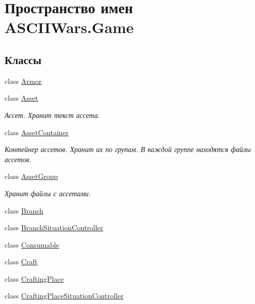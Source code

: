 \hypertarget{namespace_a_s_c_i_i_wars_1_1_game}{}\section{Пространство имен A\+S\+C\+I\+I\+Wars.\+Game}
\label{namespace_a_s_c_i_i_wars_1_1_game}
\subsection*{Классы}
\begin{DoxyCompactItemize}
\item 
class \hyperlink{class_a_s_c_i_i_wars_1_1_game_1_1_armor}{Armor}
\item 
class \hyperlink{class_a_s_c_i_i_wars_1_1_game_1_1_asset}{Asset}
\begin{DoxyCompactList}\small\item\em Ассет. Хранит текст ассета. \end{DoxyCompactList}\item 
class \hyperlink{class_a_s_c_i_i_wars_1_1_game_1_1_asset_container}{Asset\+Container}
\begin{DoxyCompactList}\small\item\em Контейнер ассетов. Хранит их по групам. В каждой группе находятся файлы ассетов. \end{DoxyCompactList}\item 
class \hyperlink{class_a_s_c_i_i_wars_1_1_game_1_1_asset_group}{Asset\+Group}
\begin{DoxyCompactList}\small\item\em Хранит файлы с ассетами. \end{DoxyCompactList}\item 
class \hyperlink{class_a_s_c_i_i_wars_1_1_game_1_1_branch}{Branch}
\item 
class \hyperlink{class_a_s_c_i_i_wars_1_1_game_1_1_branch_situation_controller}{Branch\+Situation\+Controller}
\item 
class \hyperlink{class_a_s_c_i_i_wars_1_1_game_1_1_consumable}{Consumable}
\item 
class \hyperlink{class_a_s_c_i_i_wars_1_1_game_1_1_craft}{Craft}
\item 
class \hyperlink{class_a_s_c_i_i_wars_1_1_game_1_1_crafting_place}{Crafting\+Place}
\item 
class \hyperlink{class_a_s_c_i_i_wars_1_1_game_1_1_crafting_place_situation_controller}{Crafting\+Place\+Situation\+Controller}
\item 

\end{DoxyCompactItemize}
